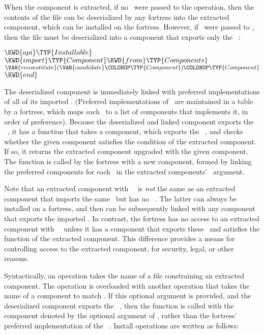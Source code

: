 When the component is extracted,
if no \prereqs\ were passed to the  operation,
then the contents of the file can be deserialized by any fortress
into the extracted component,
which can be installed on the fortress.
However, if \prereqs\ were passed to ,
then the file must be deserialized into a component
that exports only the \instapi\ \apiN:

\begin{Fortress}
\(\KWD{api} \TYP{Installable}\)\\
\(\KWD{import} \TYP{Component} \KWD{from} \TYP{Components}\)\\
\(\VAR{reconstitute}(\VAR{candidate}\COLONOP\TYP{Component})\COLONOP\TYP{Component}\)\\
\(\KWD{end}\)
\end{Fortress}

The deserialized component is immediately linked with preferred
implementations of all of its imported \apisN.
(Preferred implementations of \apisN\ are maintained in a table by
a fortress, which maps each \apiN\ to a list of components that implements
it, in order of preference).
Because the deserialized and linked  component exports the \instapi\ \apiN,
it has a  function
that takes a  component,
which exports the \prereqs\ \apisN,
and checks whether the given component
satisfies the  condition
of the extracted component.
If so, it returns the extracted component
upgraded with the given component.
The  function is called by the fortress
with a new component, formed by linking the preferred components
for each \apiN\ in the extracted components' \prereqs\ argument.

Note that an extracted component with \prereqs\ \apisN\
is \emph{not} the same as an
extracted component that imports the same \apisN\
but has no \prereqs\ \apisN.
The latter can always be installed on a fortress,
and then can be subsequently linked with any component
that exports the imported \apisN.
In contrast,
the fortress has no access to an extracted component
with \prereqs\ \apisN\
unless it has a component that exports these \apisN\
and satisfies the  function of the extracted component.
This difference provides a means
for controlling access to the extracted component,
for security, legal, or other reasons.

Syntactically, an  operation takes the name of a file
constraining an extracted component.
The \shellcommand{install} operation is overloaded with another
operation that takes the name of a component
to match \prereqs.
If this optional argument is provided,
and the deserialized component exports the \instapi\ \apiN,
then the \VAR{reconstitute} function is called
with
the component denoted by the optional argument of ,
rather than the fortress' preferred implementation of the \prereqs\ \apisN.
Install operations are written as follows:


